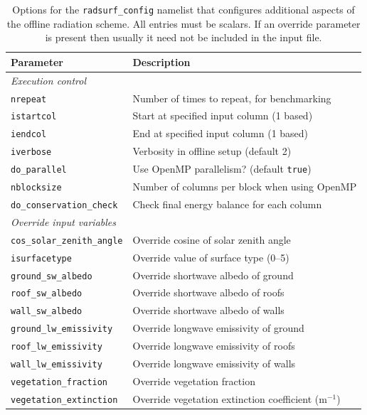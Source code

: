 \documentclass[a4,oneside]{article}
\def\tablesetup{\rowcolors{2}{light-gray}{light-gray}\small}
\def\codesize{\small}
\def\codetabsize{\footnotesize}
\def\code#1{{\codesize\texttt{#1}}}
\def\codetab#1{{\codetabsize\texttt{#1}}}
\begin{document}
{
\tablesetup
\begin{longtable}{ll}
%
\caption{\label{tab:nam_radsurf_config}Options for the
  \code{radsurf\_config} namelist that configures additional aspects
  of the offline radiation scheme. All entries must be scalars. If an
  override parameter is present then usually it need not be included
  in the input file.}\\
%
\hline
Parameter & Description\\
\hline
\multicolumn{2}{l}{\emph{Execution control}}\\
\codetab{nrepeat}  & Number of times to repeat, for benchmarking\\
\codetab{istartcol} & Start at specified input column (1 based)\\
\codetab{iendcol} & End at specified input column (1 based)\\
\codetab{iverbose} & Verbosity in offline setup (default 2)\\
\codetab{do\_parallel} & Use OpenMP parallelism? (default \codetab{true})\\
\codetab{nblocksize} & Number of columns per block when using OpenMP\\
\codetab{do\_conservation\_check} & Check final energy balance for each column\\
\hline
\multicolumn{2}{l}{\emph{Override input variables}}\\
\codetab{cos\_solar\_zenith\_angle} & Override cosine of solar zenith angle\\
\codetab{isurfacetype} & Override value of surface type (0--5)\\
\codetab{ground\_sw\_albedo} & Override shortwave albedo of ground\\
\codetab{roof\_sw\_albedo} & Override shortwave albedo of roofs\\
\codetab{wall\_sw\_albedo} & Override shortwave albedo of walls\\
\codetab{ground\_lw\_emissivity} & Override longwave emissivity of ground\\
\codetab{roof\_lw\_emissivity} & Override longwave emissivity of roofs\\
\codetab{wall\_lw\_emissivity} & Override longwave emissivity of walls\\
\codetab{vegetation\_fraction} & Override vegetation fraction \\
\codetab{vegetation\_extinction} & Override vegetation extinction coefficient (m$^{-1}$)\\

\end{longtable}}
\end{document}
